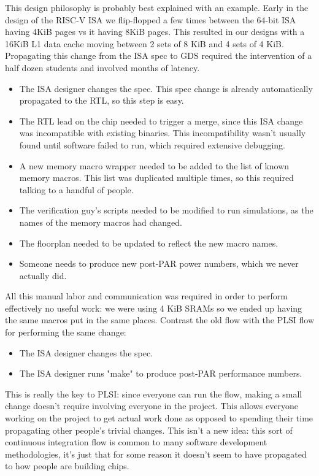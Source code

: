 \documentclass{article}
\begin{document}
This design philosophy is probably best explained with an example.  Early in
the design of the RISC-V ISA we flip-flopped a few times between the 64-bit ISA
having 4KiB pages vs it having 8KiB pages.  This resulted in our designs with a
16KiB L1 data cache moving between 2 sets of 8 KiB and 4 sets of 4 KiB.
Propagating this change from the ISA spec to GDS required the intervention of a
half dozen students and involved months of latency.

\begin{itemize}
\item The ISA designer changes the spec.  This spec change is already
automatically propagated to the RTL, so this step is easy.
\item The RTL lead on the chip needed to trigger a merge, since this ISA change
was incompatible with existing binaries.  This incompatibility wasn't usually
found until software failed to run, which required extensive debugging.
\item A new memory macro wrapper needed to be added to the list of known memory
macros.  This list was duplicated multiple times, so this required talking to a
handful of people.
\item The verification guy's scripts needed to be modified to run simulations,
as the names of the memory macros had changed.
\item The floorplan needed to be updated to reflect the new macro names.
\item Someone needs to produce new post-PAR power numbers, which we never
actually did.
\end{itemize}

All this manual labor and communication was required in order to perform
effectively no useful work: we were using 4 KiB SRAMs so we ended up having the
same macros put in the same places.  Contrast the old flow with the PLSI flow
for performing the same change:

\begin{itemize}
\item The ISA designer changes the spec.
\item The ISA designer runs "make" to produce post-PAR performance numbers.
\end{itemize}

This is really the key to PLSI: since everyone can run the flow, making a small
change doesn't require involving everyone in the project.  This allows everyone
working on the project to get actual work done as opposed to spending their
time propagating other people's trivial changes.  This isn't a new idea: this
sort of continuous integration flow is common to many software development
methodologies, it's just that for some reason it doesn't seem to have
propagated to how people are building chips.
\end{document}
